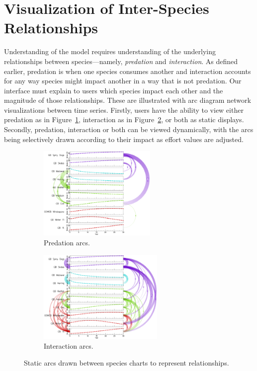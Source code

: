 \section{Visualization of Inter-Species Relationships}
\label{sec:arc}

Understanding of the model requires understanding of the underlying relationships between species---namely, \textit{predation} and \textit{interaction}.  As defined earlier, predation is when one species consumes another and interaction accounts for any way species might impact another in a way that is not predation.  Our interface must explain to users which species impact each other and the magnitude of those relationships.  These are illustrated with arc diagram network visualizations between time series.  Firstly, users have the ability to view either predation as in Figure~\ref{fig:arcsPredation}, interaction as in Figure~\ref{fig:arcsInteraction}, or both as static displays.  Secondly, predation, interaction or both can be viewed dynamically, with the arcs being selectively drawn according to their impact as effort values are adjusted.

\begin{figure}
\centering
	\begin{subfigure}[b]{0.48\textwidth}
		\centering
		\includegraphics[height=4.5cm]{figures/eps/arcs_predation.eps}
		\caption{Predation arcs.}
		\label{fig:arcsPredation}
	\end{subfigure}	
	\begin{subfigure}[b]{0.48\textwidth}
		\centering
		\includegraphics[height=4.5cm]{figures/eps/arcs_interaction.eps}
		\caption{Interaction arcs.}
		\label{fig:arcsInteraction}
	\end{subfigure}
	\caption{Static arcs drawn between species charts to represent relationships.}
	\label{fig:betweenSpeciesArcs}
\end{figure}

